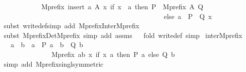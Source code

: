 \begin{isabellebody}
\ \ \ \ \ \ \ \ \ \ {\isacharequal}{\kern0pt}\ Mprefix\ {\isacharparenleft}{\kern0pt}insert\ a\ A{\isacharparenright}{\kern0pt}\ {\isacharparenleft}{\kern0pt}{\isasymlambda}x{\isachardot}{\kern0pt}\ if\ x\ {\isacharequal}{\kern0pt}\ a\ then\ {\isacharparenleft}{\kern0pt}P\ {\isacharbar}{\kern0pt}{\isacharbar}{\kern0pt}{\isacharbar}{\kern0pt}\ Mprefix\ A\ Q{\isacharparenright}{\kern0pt}\ \isanewline
\ \ \ \ \ \ \ \ \ \ \ \ \ \ \ \ \ \ \ \ \ \ \ \ \ \ \ \ \ \ \ \ \ \ \ \ \ \ \ \ \ \ \ \ \ \ \ else\ {\isacharparenleft}{\kern0pt}{\isacharparenleft}{\kern0pt}a\ {\isasymrightarrow}\ P{\isacharparenright}{\kern0pt}\ {\isacharbar}{\kern0pt}{\isacharbar}{\kern0pt}{\isacharbar}{\kern0pt}\ Q\ x{\isacharparenright}{\kern0pt}\ {\isacharparenright}{\kern0pt}{\isachardoublequoteclose}\isanewline
%
\isadelimproof
\ \ %
\endisadelimproof
%
\isatagproof
{}\isamarkupfalse%
{\isacharparenleft}{\kern0pt}subst\ write{}{\isacharunderscore}{\kern0pt}def{\isacharcomma}{\kern0pt}simp\ add{\isacharcolon}{\kern0pt}\ Mprefix{\isacharunderscore}{\kern0pt}Inter{\isacharunderscore}{\kern0pt}Mprefix{\isacharparenright}{\kern0pt}\isanewline
\ \ \isamarkupfalse%
{\isacharparenleft}{\kern0pt}subst\ Mprefix{\isacharunderscore}{\kern0pt}Det{\isacharunderscore}{\kern0pt}Mprefix{\isacharcomma}{\kern0pt}\ simp\ add{\isacharcolon}{\kern0pt}\ assms{\isacharparenright}{\kern0pt}\isanewline
\ \ \isamarkupfalse%
{\isacharparenleft}{\kern0pt}fold\ write{}{\isacharunderscore}{\kern0pt}def{\isacharcomma}{\kern0pt}\ simp{\isacharparenright}{\kern0pt}%
\endisatagproof
{\isafoldproof}%
%
\isadelimproof
\isanewline
%
\endisadelimproof
\isanewline
{}\isamarkupfalse%
\ inter{}Mprefix{}{\isacharcolon}{\kern0pt}\isanewline
\ \ {\isachardoublequoteopen}a\ {\isasymnoteq}\ b\ {\isasymLongrightarrow}\ {\isacharparenleft}{\kern0pt}{\isacharparenleft}{\kern0pt}a\ {\isasymrightarrow}\ P\ a{\isacharparenright}{\kern0pt}\ {\isasymbox}\ {\isacharparenleft}{\kern0pt}b\ {\isasymrightarrow}\ Q\ b{\isacharparenright}{\kern0pt}{\isacharparenright}{\kern0pt}\ \isanewline
\ \ \ \ \ \ \ \ \ \ \ \ \ {\isacharequal}{\kern0pt}\ Mprefix\ {\isacharbraceleft}{\kern0pt}a{\isacharcomma}{\kern0pt}b{\isacharbraceright}{\kern0pt}\ {\isacharparenleft}{\kern0pt}{\isasymlambda}x{\isachardot}{\kern0pt}\ if\ x{\isacharequal}{\kern0pt}\ a\ then\ P\ a\ else\ Q\ b{\isacharparenright}{\kern0pt}{\isachardoublequoteclose}\isanewline
%
\isadelimproof
\ \ %
\endisadelimproof
%
\isatagproof
{}\isamarkupfalse%
{\isacharparenleft}{\kern0pt}simp\ add{\isacharcolon}{\kern0pt}\ Mprefix{\isacharunderscore}{\kern0pt}singl{\isacharbrackleft}{\kern0pt}symmetric{\isacharbrackright}{\kern0pt}\ {\isacharparenright}{\kern0pt}\isanewline

\end{isabellebody}
